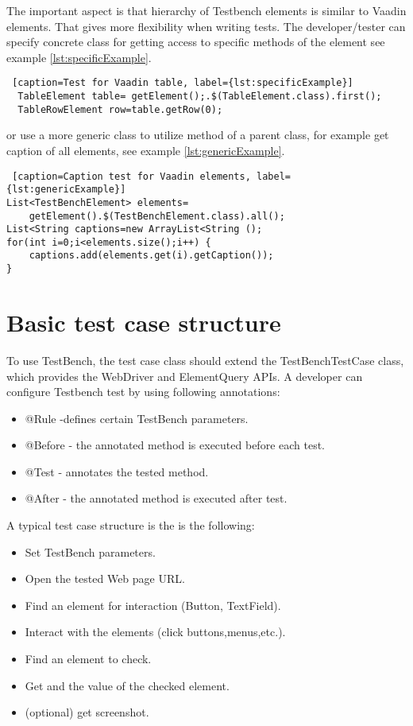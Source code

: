 The important aspect is that hierarchy of Testbench elements is similar to Vaadin elements.
That gives more flexibility when writing tests. The  developer/tester can
specify concrete class for getting access to specific methods of the element see example \ref{lst:specificExample}.
 
\lstset{style=a1listing}
\begin{lstlisting} [caption=Test for Vaadin table, label={lst:specificExample}]
  TableElement table= getElement();.$(TableElement.class).first();
  TableRowElement row=table.getRow(0);
 \end{lstlisting}
 
or use a more generic class to utilize method of a parent class, for example get
caption of all elements, see example \ref{lst:genericExample}.

\lstset{style=a1listing}
\begin{lstlisting} [caption=Caption test for Vaadin elements, label={lst:genericExample}]
List<TestBenchElement> elements=
	getElement().$(TestBenchElement.class).all();
List<String captions=new ArrayList<String ();
for(int i=0;i<elements.size();i++) {
	captions.add(elements.get(i).getCaption());
}
\end{lstlisting}

\section {Basic test case structure}
To use TestBench, the test case class should extend the TestBenchTestCase class,
which provides the WebDriver and ElementQuery APIs. A developer
can configure Testbench test by using following annotations:
\begin{itemize}
  \item @Rule -defines certain TestBench parameters.
  \item @Before - the annotated method is executed before each test.
  \item @Test - annotates the tested method.
  \item @After - the annotated method is executed after test.
\end{itemize}

A typical test case structure is the is the following:
\begin{itemize}
  \item Set TestBench parameters.
  \item Open the tested Web page URL.
  \item Find an element for interaction (Button, TextField).
  \item Interact with the elements (click buttons,menus,etc.).
  \item Find an element to check.
  \item Get and the value of the checked element.
  \item (optional) get screenshot.
\end{itemize}


